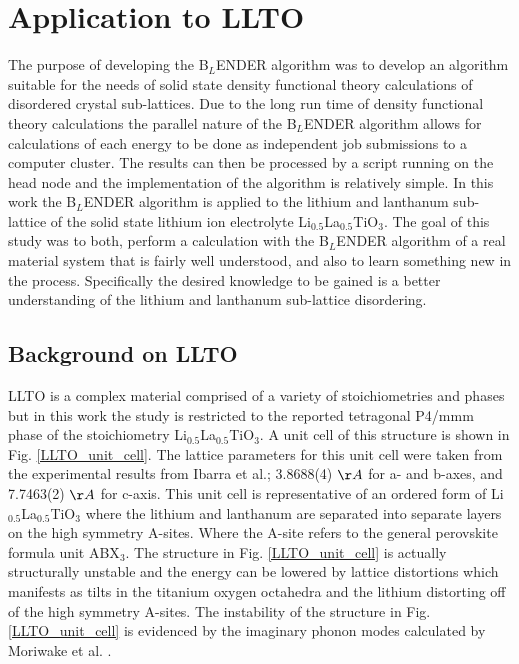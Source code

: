 \documentclass[aps,pre,reprint,superscriptaddress,showkeys]{revtex4-2}
\begin{document}
\section{Application to LLTO}
\label{sec4}
The purpose of developing the B$_L$ENDER algorithm was to develop an algorithm suitable for the needs of solid state density functional theory calculations of disordered crystal sub-lattices.  Due to the long run time of density functional theory calculations  the parallel nature of the B$_L$ENDER algorithm allows for calculations of each energy to be done as independent job submissions to a computer cluster. The results can then be processed by a script running on the head node and the implementation of the algorithm is relatively simple.  In this work the B$_L$ENDER algorithm is applied to the lithium and lanthanum sub-lattice of the solid state lithium ion electrolyte  Li$_{0.5}$La$_{0.5}$TiO$_{3}$. The goal of this study was to both, perform a calculation with the B$_L$ENDER algorithm  of a real material system that is fairly well understood, and also to learn something new in the process.  Specifically the desired knowledge to be gained is a better understanding of the lithium and lanthanum sub-lattice disordering. 



\subsection{Background on LLTO}
LLTO is a complex material comprised of a variety of stoichiometries and phases but in this work the study is restricted to the reported tetragonal P4/mmm phase of the stoichiometry Li$_{0.5}$La$_{0.5}$TiO$_{3}$\cite{LLTOreview,P4mmmstrucuture}. A unit cell of this structure is shown in Fig. \ref{LLTO_unit_cell}. The lattice parameters for this unit cell were taken from the experimental results from Ibarra et al.\cite{P4mmmstrucuture}; 3.8688(4) $\AA$ for a- and b-axes, and 7.7463(2) $\AA$ for c-axis.  This unit cell is representative of an ordered form of Li$_{0.5}$La$_{0.5}$TiO$_{3}$ where the lithium and lanthanum are separated into separate layers on the high symmetry A-sites. Where the A-site refers to the general perovskite formula unit ABX$_3$.  The structure in Fig. \ref{LLTO_unit_cell} is actually structurally unstable and the energy can be lowered by lattice distortions which manifests as tilts in the titanium oxygen octahedra and the lithium  distorting off of the high symmetry A-sites. The instability of the structure in Fig. \ref{LLTO_unit_cell} is evidenced by the imaginary phonon modes calculated by Moriwake et al. \cite{imaginaryphonons}.  
\end{document}
